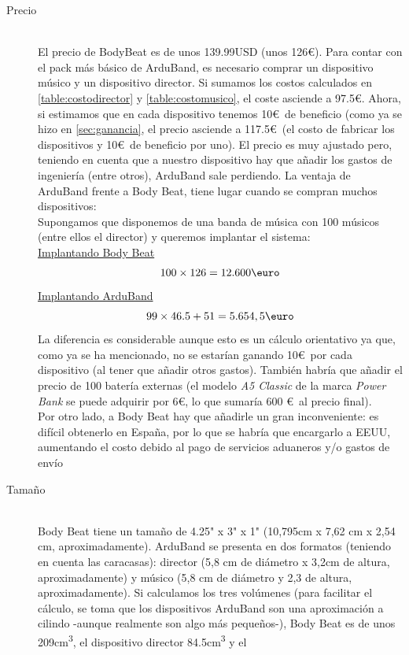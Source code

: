 \begin{description}
  \item[Precio] \hfill \\
    El precio de BodyBeat es de unos 139.99USD (unos 126\euro). Para contar con el pack más básico de ArduBand, es
    necesario comprar un dispositivo músico y un dispositivo director. Si sumamos los costos
    calculados en \ref{table:costodirector} y \ref{table:costomusico}, el coste asciende a 97.5\euro.
    Ahora, si estimamos que en cada dispositivo tenemos 10\euro\ de beneficio (como ya se hizo en \ref{sec:ganancia},
    el precio asciende a 117.5\euro\ (el costo de fabricar los dispositivos y 10\euro\ de beneficio por uno). El precio
    es muy ajustado pero, teniendo en cuenta que a nuestro dispositivo hay que añadir los gastos de ingeniería (entre otros),
    ArduBand sale perdiendo. La ventaja de ArduBand frente a Body Beat, tiene lugar cuando
    se compran muchos dispositivos:\\
    Supongamos que disponemos de una banda de música con 100 músicos (entre ellos el director)
    y queremos implantar el sistema:\\
    \underline{Implantando Body Beat}
    \[
      100 \times 126 = 12.600 \textup{\euro}
    \]
    \underline{Implantando ArduBand}
    \[
      99 \times 46.5 + 51 = 5.654,5 \textup{\euro}
    \]
    La diferencia es considerable aunque esto es un cálculo orientativo ya que, como ya se ha mencionado,
    no se estarían ganando 10\euro\ por cada dispositivo (al tener que añadir otros gastos). También
    habría que añadir el precio de 100 batería externas (el modelo \textit{A5 Classic} de la marca \textit{Power Bank} se puede
    adquirir por 6\euro, lo que sumaría 600 \euro\ al precio final).\\
    Por otro lado, a Body Beat hay que añadirle un gran inconveniente: es difícil
    obtenerlo en España, por lo que se habría que encargarlo a EEUU, aumentando el costo
    debido al pago de servicios aduaneros y/o gastos de envío
  \item[Tamaño] \hfill \\
    Body Beat tiene un tamaño de 4.25" x 3" x 1" (10,795cm x 7,62 cm x 2,54 cm, aproximadamente).
    ArduBand se presenta en dos formatos (teniendo en cuenta las caracasas): director (5,8 cm de diámetro x 3,2cm de altura,
    aproximadamente) y músico (5,8 cm de diámetro y 2,3 de altura, aproximadamente). Si calculamos los tres volúmenes (para facilitar
    el cálculo, se toma que los dispositivos ArduBand son una aproximación a cilindo -aunque realmente son algo más pequeños-),
    Body Beat es de unos 209cm\textsuperscript{3}, el dispositivo director 84.5cm\textsuperscript{3} y el

\end{description}
